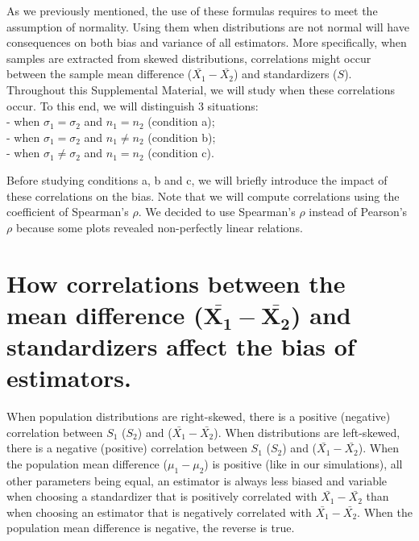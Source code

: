 \documentclass[
  english,
  man,mask,floatsintext]{apa6}
\begin{document}
As we previously mentioned, the use of these formulas requires to meet the assumption of normality. Using them when distributions are not normal will have consequences on both bias and variance of all estimators. More specifically, when samples are extracted from skewed distributions, correlations might occur between the sample mean difference (\(\bar{X_1}-\bar{X_2}\)) and standardizers (\(S\)). Throughout this Supplemental Material, we will study when these correlations occur. To this end, we will distinguish 3 situations:\\
- when \(\sigma_1=\sigma_2\) and \(n_1=n_2\) (condition a);\\
- when \(\sigma_1=\sigma_2\) and \(n_1\neq n_2\) (condition b);\\
- when \(\sigma_1 \neq \sigma_2\) and \(n_1 = n_2\) (condition c).

Before studying conditions a, b and c, we will briefly introduce the impact of these correlations on the bias. Note that we will compute correlations using the coefficient of Spearman's \(\rho\). We decided to use Spearman's \(\rho\) instead of Pearson's \(\rho\) because some plots revealed non-perfectly linear relations.

\hypertarget{how-correlations-between-the-mean-difference-bmbarx_1-barx_2-and-standardizers-affect-the-bias-of-estimators.}{%
\section{\texorpdfstring{How correlations between the mean difference (\(\bm{\bar{X_1}-\bar{X_2}}\)) and standardizers affect the bias of estimators.}{How correlations between the mean difference (\textbackslash bm\{\textbackslash bar\{X\_1\}-\textbackslash bar\{X\_2\}\}) and standardizers affect the bias of estimators.}}\label{how-correlations-between-the-mean-difference-bmbarx_1-barx_2-and-standardizers-affect-the-bias-of-estimators.}}

When population distributions are right-skewed, there is a positive (negative) correlation between \(S_1\) (\(S_2\)) and (\(\bar{X_1}-\bar{X_2}\)). When distributions are left-skewed, there is a negative (positive) correlation between \(S_1\) (\(S_2\)) and (\(\bar{X_1}-\bar{X_2}\)). When the population mean difference (\(\mu_1-\mu_2\)) is positive (like in our simulations), all other parameters being equal, an estimator is always less biased and variable when choosing a standardizer that is positively correlated with \(\bar{X_1}-\bar{X_2}\) than when choosing an estimator that is negatively correlated with \(\bar{X_1}-\bar{X_2}\). When the population mean difference is negative, the reverse is true.
\end{document}
